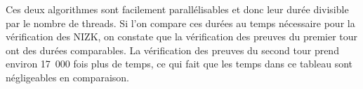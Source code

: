 \documentclass[../report]{subfiles}
\begin{document}
Ces deux algorithmes sont facilement parallélisables et donc leur durée divisible par le nombre de threads. 
Si l'on compare ces durées au temps nécessaire pour la vérification des NIZK, on constate que la vérification des 
preuves du premier tour ont des durées comparables.
La vérification des preuves du second tour prend environ 17~000 fois plus de temps,
ce qui fait que les temps dans ce tableau sont négligeables en comparaison.

\end{document}
